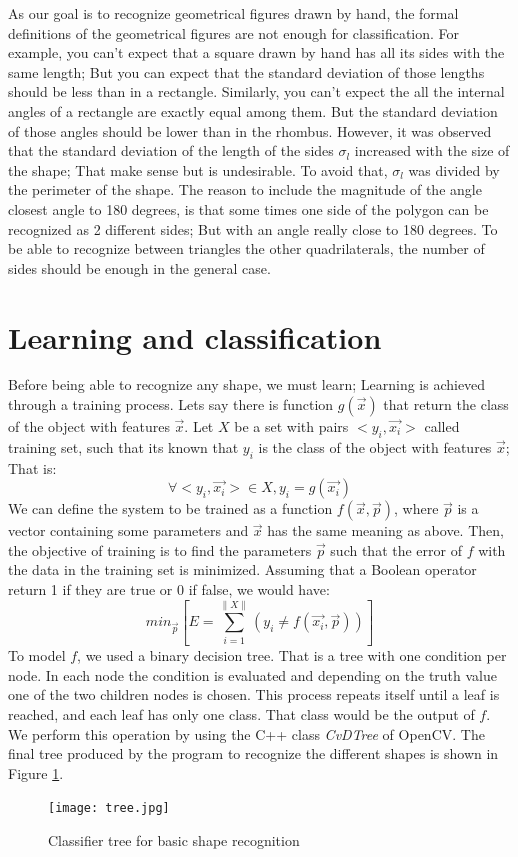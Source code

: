 \documentclass[10pt,journal]{IEEEtran}
\begin{document}
	As our goal is to recognize geometrical figures drawn by hand, the formal definitions
	of the geometrical figures are not enough for classification. For example, you can't expect that 
	a square drawn by hand has all its sides with the same length; But you can expect 
	that the standard deviation of those lengths should be less than in a rectangle.
	Similarly, you can't expect the all the internal angles of a rectangle are
	exactly equal among them. But the standard deviation of those angles should be
	lower than in the rhombus.\newline
	However, it was observed that the standard deviation of the length of the sides
	$\sigma_l$ increased with the size of the shape; That make sense but is
	undesirable. To avoid that, $\sigma_l$ was divided by the perimeter of the shape.
	The reason to include the magnitude of the angle closest angle to 180 degrees, is
	that some times one side of the polygon can be recognized as 2 different sides;
	But with an angle really close to 180 degrees.
	To be able to recognize between triangles the other quadrilaterals, the number of
	sides should be enough in the general case.
	
	\section{Learning and classification}
	Before being able to recognize any shape, we must learn; Learning is achieved
	through a training process.  Lets say there is function $g(\vec{x})$ that 
	return the class of the object with features $\vec{x}$. 
	Let $X$ be a set with pairs $<y_i,\vec{x_i}>$ called training set, such that
	its known that $y_i$ is the class of the object with features $\vec{x}$; That is:
	\[ \forall <y_i,\vec{x_i}> \in X , y_i=g(\vec{x_i}) \]
	We can define the system to be trained as a function $f(\vec{x},\vec{p})$,
	where $\vec{p}$ is a vector containing some parameters and $\vec{x}$ has
	the same meaning as above. Then, the objective of training is to find the
	parameters $\vec{p}$ such that the error of $f$ with the data in the training
	set is minimized. Assuming that a Boolean operator return 1 if they are true
	or 0 if false, we would have:
	\[ min_{\vec{p}} \left[ E = \sum_{i=1}^{\| X \|}  
		( y_i \not= f(\vec{x_i},\vec{p}) ) \right] \]
	To model $f$, we used a binary decision tree\cite{cart}. That is a tree with one
	condition per node. In each node the condition is evaluated and depending
	on the truth value one of the two children nodes is chosen. This process
	repeats itself until a leaf is reached, and each leaf has only one class.
	That class would be the output of $f$. We perform this operation by using the
	C++ class \textit{CvDTree} of OpenCV. The final tree produced by the program to
	recognize the different shapes is shown in Figure \ref{fig:tree}.
	\begin{figure}[htb]
	\begin{center}
	\leavevmode
	\texttt{[image: tree.jpg]}
	\end{center}
	\caption{Classifier tree for basic shape recognition}
	\label{fig:tree}
	\end{figure}
	
\end{document}
